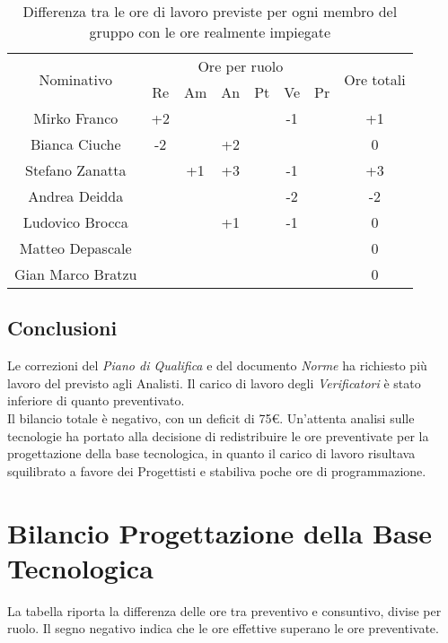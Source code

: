 \begin{flushleft}
\begin{table}[ht]
\begin{center}
\begin{tabularx}{\textwidth}{|c|cccccc|c|}
  			\hline
  			\multirow{2}{*}{Nominativo} & \multicolumn{6}{c|}{Ore per ruolo} & \multirow{2}{*}{Ore totali} \\ \cline{2-7}
  			& Re & Am & An & Pt & Ve & Pr &      \\ \hline
  			\endhead
  			Mirko Franco       &  +2 &    &    &    & -1 &   & +1    \\ \hline
  			Bianca Ciuche      & -2 &    & +2 &    &  &   & 0        \\ \hline
  			Stefano Zanatta    &   &  +1 & +3 &  &  -1 &   & +3        \\ \hline
  			Andrea Deidda      &   &  &   &   &  -2 &   & -2  		\\ \hline
  			Ludovico Brocca    &   &  & +1 &  & -1 &   & 0        \\ \hline
  			Matteo Depascale   &   &  &   &   &   &  & 0  		\\ \hline
  			Gian Marco Bratzu  &   &  &   &   &  &   & 0        \\ \hline
  			
  		\end{tabularx}
  		\caption{Differenza tra le ore di lavoro previste per ogni membro del gruppo con le ore realmente impiegate }
  	\end{center}
  \end{table}
  
  \subsection{Conclusioni}
  Le correzioni del \textit{Piano di Qualifica} e del documento \textit{Norme} ha richiesto più lavoro del previsto agli {Analisti}. Il carico di lavoro degli \textit{Verificatori} è stato inferiore di quanto preventivato.\\ Il bilancio totale è negativo, con un deficit di 75\euro.
  Un'attenta analisi sulle tecnologie ha portato alla decisione di redistribuire le ore preventivate per la progettazione della base tecnologica, in quanto il carico di lavoro risultava squilibrato a favore dei Progettisti e stabiliva poche ore di programmazione.
   
  \newpage


  \section{Bilancio Progettazione della Base Tecnologica}
  La tabella riporta la differenza delle ore tra preventivo e consuntivo, divise per ruolo. Il segno negativo indica che le ore effettive superano le ore preventivate.
  

\end{flushleft}
